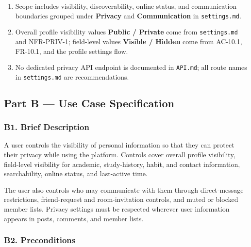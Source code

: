 \documentclass[12pt]{article}
\begin{document}
\begin{enumerate}
\item Scope includes visibility, discoverability, online status, and communication boundaries grouped under \textbf{Privacy} and \textbf{Communication} in \texttt{settings.md}.
\item Overall profile visibility values \textbf{Public / Private} come from \texttt{settings.md} and NFR-PRIV-1; field-level values \textbf{Visible / Hidden} come from AC-10.1, FR-10.1, and the profile settings flow.
\item No dedicated privacy API endpoint is documented in \texttt{API.md}; all route names in \texttt{settings.md} are recommendations.
\end{enumerate}
\par\medskip

\hypertarget{sec:part-b-use-case-specification}{}
\subsection*{Part B --- Use Case Specification}
\par\medskip

\hypertarget{sec:b1-brief-description}{}
\subsubsection*{B1. Brief Description}
\par\medskip

A user controls the visibility of personal information so that they can protect their privacy while using the platform. Controls cover overall profile visibility, field-level visibility for academic, study-history, habit, and contact information, searchability, online status, and last-active time.
\par\medskip

The user also controls who may communicate with them through direct-message restrictions, friend-request and room-invitation controls, and muted or blocked member lists. Privacy settings must be respected wherever user information appears in posts, comments, and member lists.
\par\medskip

\hypertarget{sec:b2-preconditions}{}
\subsubsection*{B2. Preconditions}
\par\medskip
\end{document}
